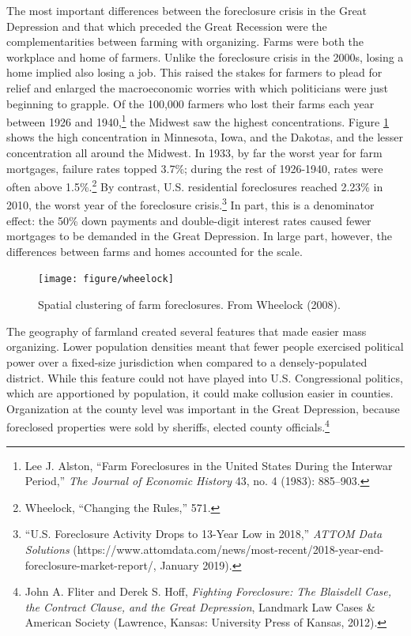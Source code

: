 \documentclass[12pt,oneside]{psthesis}
\begin{document}
The most important differences between the foreclosure crisis in the Great Depression and that which preceded the Great Recession were the complementarities between farming with organizing.
Farms were both the workplace and home of farmers.
Unlike the foreclosure crisis in the 2000s, losing a home implied also losing a job.
This raised the stakes for farmers to plead for relief and enlarged the macroeconomic worries with which politicians were just beginning to grapple.
Of the 100,000 farmers who lost their farms each year between 1926 and 1940,\footnote{Lee J. Alston, ``Farm Foreclosures in the United States During the Interwar Period,'' \emph{The Journal of Economic History} 43, no. 4 (1983): 885--903.} the Midwest saw the highest concentrations.
Figure \ref{fig:wheelock-farms} shows the high concentration in Minnesota, Iowa, and the Dakotas, and the lesser concentration all around the Midwest.
In 1933, by far the worst year for farm mortgages, failure rates topped 3.7\%; during the rest of 1926-1940, rates were often above 1.5\%.\footnote{Wheelock, ``Changing the Rules,'' 571.}
By contrast, U.S. residential foreclosures reached 2.23\% in 2010, the worst year of the foreclosure crisis.\footnote{``U.S. Foreclosure Activity Drops to 13-Year Low in 2018,'' \emph{ATTOM Data Solutions} (https://www.attomdata.com/news/most-recent/2018-year-end-foreclosure-market-report/, January 2019).}
In part, this is a denominator effect: the 50\% down payments and double-digit interest rates caused fewer mortgages to be demanded in the Great Depression.
In large part, however, the differences between farms and homes accounted for the scale.
\begin{figure}

{\centering \texttt{[image: figure/wheelock]} 

}

\caption{Spatial clustering of farm foreclosures. From Wheelock (2008).}\label{fig:wheelock-farms}
\end{figure}
The geography of farmland created several features that made easier mass organizing.
Lower population densities meant that fewer people exercised political power over a fixed-size jurisdiction when compared to a densely-populated district.
While this feature could not have played into U.S. Congressional politics, which are apportioned by population, it could make collusion easier in counties.
Organization at the county level was important in the Great Depression, because foreclosed properties were sold by sheriffs, elected county officials.\footnote{John A. Fliter and Derek S. Hoff, \emph{Fighting Foreclosure: The Blaisdell Case, the Contract Clause, and the Great Depression}, Landmark Law Cases \& American Society (Lawrence, Kansas: University Press of Kansas, 2012).}
\end{document}
